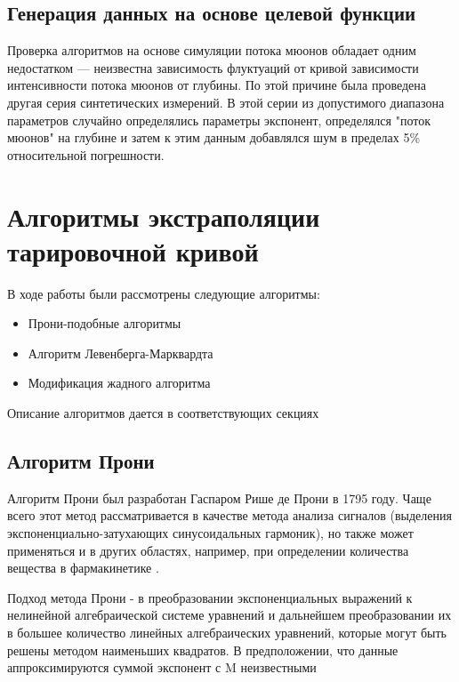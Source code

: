 \subsection{Генерация данных на основе целевой функции}\label{subsect2_3_2}


Проверка алгоритмов на основе симуляции потока мюонов обладает 
одним недостатком --- неизвестна зависимость флуктуаций от  
кривой зависимости интенсивности 
потока мюонов от глубины. По этой причине была проведена другая серия 
синтетических измерений. В этой серии из допустимого диапазона 
параметров случайно определялись параметры 
экспонент, определялся "поток мюонов" на глубине и затем к этим 
данным добавлялся шум в пределах 5\% относительной погрешности.



\section{Алгоритмы экстраполяции тарировочной кривой}\label{sect2_4}

В ходе работы были рассмотрены следующие алгоритмы:

\begin{itemize}
 \item Прони-подобные алгоритмы
 \item Алгоритм Левенберга-Марквардта
 \item Модификация жадного алгоритма
 
\end{itemize}

Описание алгоритмов дается в соответствующих секциях

\subsection{Алгоритм Прони}\label{subsect2_4_1}

Алгоритм Прони был разработан Гаспаром Рише де Прони в 1795 году\cite{prony}. Чаще всего этот метод рассматривается в 
качестве метода анализа сигналов (выделения экспоненциально-затухающих
синусоидальных гармоник), но также может применяться и в других областях, например, при определении количества 
вещества в фармакинетике \cite{pharmakinetics}.

Подход метода Прони - в преобразовании экспоненциальных выражений к нелинейной алгебраической системе уравнений и 
дальнейшем преобразовании их в большее количество линейных алгебраических уравнений, которые могут быть решены 
методом наименьших квадратов. В предположении, что данные аппроксимируются суммой экспонент с M неизвестными

